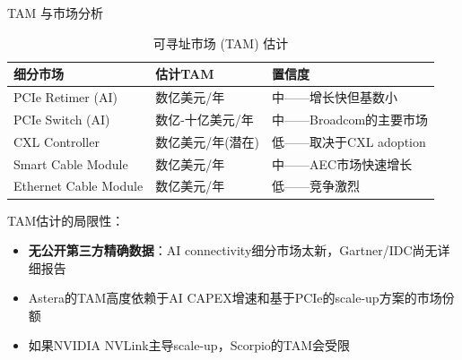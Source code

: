 \documentclass[UTF8,11pt,aspectratio=169]{beamer}
\begin{document}
\begin{frame}{TAM 与市场分析}
    \begin{table}
        \caption{可寻址市场 (TAM) 估计}
        \begin{tabular}{lll}
            \toprule
            \textbf{细分市场} & \textbf{估计TAM} & \textbf{置信度} \\
            \midrule
            PCIe Retimer (AI) & 数亿美元/年 & 中——增长快但基数小 \\
            PCIe Switch (AI) & 数亿-十亿美元/年 & 中——Broadcom的主要市场 \\
            CXL Controller & 数亿美元/年(潜在) & 低——取决于CXL adoption \\
            Smart Cable Module & 数亿美元/年 & 中——AEC市场快速增长 \\
            Ethernet Cable Module & 数亿美元/年 & 低——竞争激烈 \\
            \bottomrule
        \end{tabular}
    \end{table}

    \begin{warningblock}
        TAM估计的局限性：
        \begin{itemize}
            \item \textbf{无公开第三方精确数据}：AI connectivity细分市场太新，Gartner/IDC尚无详细报告
            \item Astera的TAM高度依赖于\alert{AI CAPEX增速}和\alert{基于PCIe的scale-up方案的市场份额}
            \item 如果NVIDIA NVLink主导scale-up，Scorpio的TAM会受限
        \end{itemize}
    \end{warningblock}
\end{frame}

\end{document}
